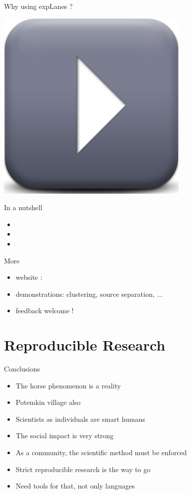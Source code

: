 \documentclass[compress]{beamer}
\begin{document}
\begin{frame}{Why using expLanes ?}
\begin{center}
\includegraphics[width=.6\columnwidth]{figures/play} \\
\end{center}
\end{frame}

\begin{frame}{In a nutshell}
\begin{itemize}
\item
\item
\item
\end{itemize}
\end{frame}

\begin{frame}{More}
\begin{itemize}
\item website :
\item demonstrations: clustering, source separation, ...
\item feedback welcome !
\end{itemize}
\end{frame}

\section{Reproducible Research}

\begin{frame}{Conclusions}
\begin{itemize}
\item The horse phenomenon is a reality
\item Potemkin village also
\item Scientists as individuals are smart humans
\item The social impact is very strong
\item As a community, the scientific method must be enforced
\item Strict reproducible research is the way to go
\item Need tools for that, not only languages
\end{itemize}
\end{frame}
\end{document}
